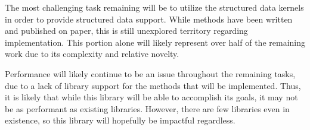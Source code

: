 \documentclass{sig-alternate}
\begin{document}
The most challenging task remaining will be to utilize the structured data kernels in order to
provide structured data support. While methods have been written and published on paper,
this is still unexplored territory regarding implementation. This portion alone will likely 
represent over half of the remaining work due to its complexity and relative novelty. 

Performance will likely continue to be an issue throughout the remaining tasks, due to a lack
of library support for the methods that will be implemented. Thus, it is likely that while 
this library will be able to accomplish its goals, it may not be as performant as existing 
libraries. However, there are few libraries even in existence, so this library will hopefully
be impactful regardless. 

\vspace{15pt}
\vspace{175pt}
\end{document}
